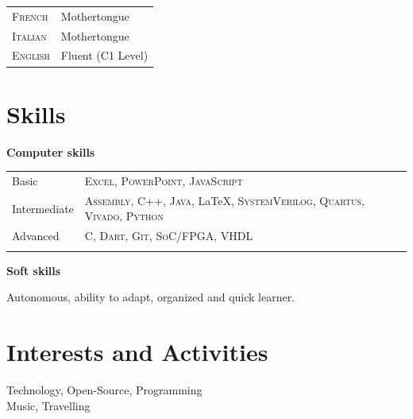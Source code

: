 \documentclass[a4paper,10pt]{article}
\begin{document}
\begin{tabular}{p{2.3cm}l}
    \textsc{French}  & Mothertongue \\
    \textsc{Italian} & Mothertongue \\
    \textsc{English} & Fluent (C1 Level)\\
\end{tabular}

\section{Skills}

\textbf{Computer skills} \\
\begin{tabular}{p{2.3cm}l}
    Basic & \textsc{Excel}, \textsc{PowerPoint}, \textsc{JavaScript} \\
    Intermediate & \textsc{Assembly}, \textsc{C++}, \textsc{Java}, \LaTeX, \textsc{SystemVerilog}, \textsc{Quartus}, \textsc{Vivado}, \textsc{Python}  \\
    Advanced & \textsc{C}, \textsc{Dart}, \textsc{Git}, \textsc{SoC/FPGA}, \textsc{VHDL} \\
    \\
\end{tabular}

\parbox{2.8cm}{\textbf{Soft skills}} Autonomous, ability to adapt, organized and quick learner.


\section{Interests and Activities}

Technology, Open-Source, Programming \\
Music, Travelling
\end{document}
